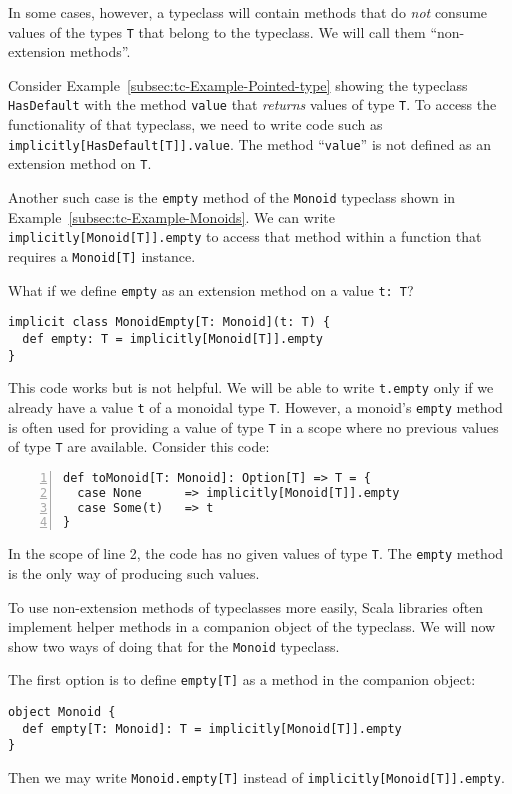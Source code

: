 In some cases, however, a typeclass will contain methods that do \emph{not}
consume values of the types \lstinline!T! that belong to the typeclass.
We will call them \textsf{``}non-extension methods\textsf{''}.

Consider Example~\ref{subsec:tc-Example-Pointed-type} showing the
typeclass \lstinline!HasDefault! with the method \lstinline!value!
that \emph{returns} values of type \lstinline!T!. To access the functionality
of that typeclass, we need to write code such as \lstinline!implicitly[HasDefault[T]].value!.
The method \textsf{``}\lstinline!value!\textsf{''} is not defined as an extension
method on \lstinline!T!.

Another such case is the \lstinline!empty! method of the \lstinline!Monoid!
typeclass shown in Example~\ref{subsec:tc-Example-Monoids}. We can
write \lstinline!implicitly[Monoid[T]].empty! to access that method
within a function that requires a \lstinline!Monoid[T]! instance.

What if we define \lstinline!empty! as an extension method on a value
\lstinline!t: T!?
\begin{lstlisting}
implicit class MonoidEmpty[T: Monoid](t: T) {
  def empty: T = implicitly[Monoid[T]].empty
}
\end{lstlisting}
This code works but is not helpful. We will be able to write \lstinline!t.empty!
only if we already have a value \lstinline!t! of a monoidal type
\lstinline!T!. However, a monoid\textsf{'}s \lstinline!empty! method is often
used for providing a value of type \lstinline!T! in a scope where
no previous values of type \lstinline!T! are available. Consider
this code:
\begin{lstlisting}[numbers=left]
def toMonoid[T: Monoid]: Option[T] => T = {
  case None      => implicitly[Monoid[T]].empty
  case Some(t)   => t
}
\end{lstlisting}
In the scope of line 2, the code has no given values of type \lstinline!T!.
The \lstinline!empty! method is the only way of producing such values.

To use non-extension methods of typeclasses more easily, Scala libraries
often implement helper methods in a companion object of the typeclass.
We will now show two ways of doing that for the \lstinline!Monoid!
typeclass. 

The first option is to define \lstinline!empty[T]! as a method in
the companion object:
\begin{lstlisting}
object Monoid {
  def empty[T: Monoid]: T = implicitly[Monoid[T]].empty
}
\end{lstlisting}
Then we may write \lstinline!Monoid.empty[T]! instead of \lstinline!implicitly[Monoid[T]].empty!.

